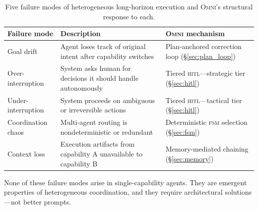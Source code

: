 \documentclass[11pt,a4paper]{article}
\newcommand{\omni}{\textsc{Omni}}
\newcommand{\hitl}{\textsc{hitl}}
\newcommand{\fsm}{\textsc{fsm}}
\begin{document}
\begin{table}[h]
\centering
\caption{Five failure modes of heterogeneous long-horizon execution and \omni{}'s structural response to each.}
\label{tab:failure_modes}
\small
\begin{tabularx}{\textwidth}{lXl}
\toprule
\textbf{Failure mode} & \textbf{Description} & \textbf{\omni{} mechanism} \\
\midrule
Goal drift & Agent loses track of original intent after capability switches & Plan-anchored correction loop (\S\ref{sec:plan_loop}) \\
Over-interruption & System asks human for decisions it should handle autonomously & Tiered \hitl{}---strategic tier (\S\ref{sec:hitl}) \\
Under-interruption & System proceeds on ambiguous or irreversible actions & Tiered \hitl{}---tactical tier (\S\ref{sec:hitl}) \\
Coordination chaos & Multi-agent routing is nondeterministic or redundant & Deterministic \fsm{} selection (\S\ref{sec:fsm}) \\
Context loss & Execution artifacts from capability A unavailable to capability B & Memory-mediated chaining (\S\ref{sec:memory}) \\
\bottomrule
\end{tabularx}
\end{table}

None of these failure modes arise in single-capability agents. They are emergent properties of heterogeneous coordination, and they require architectural solutions---not better prompts.
\end{document}
